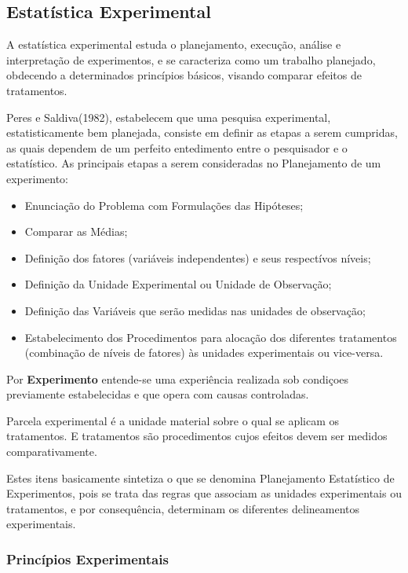 \subsection{Estatística Experimental}

A estatística experimental estuda o planejamento, execução, análise e interpretação de experimentos, e se caracteriza como um trabalho planejado, obdecendo a determinados princípios básicos, visando comparar efeitos de tratamentos.\vskip0.3cm

Peres e Saldiva(1982), estabelecem que uma pesquisa experimental, estatisticamente bem planejada, consiste em definir as etapas a serem cumpridas, as quais dependem de um perfeito entedimento entre o pesquisador e o estatístico. As principais etapas a serem consideradas no Planejamento de um experimento:


\begin{itemize}
\item Enunciação do Problema com Formulações das Hipóteses;
\item Comparar as Médias;
\item Definição dos fatores (variáveis independentes) e seus respectívos níveis;
\item Definição da Unidade Experimental ou Unidade de Observação;
\item Definição das Variáveis que serão medidas nas unidades de observação;
\item Estabelecimento dos Procedimentos para alocação dos diferentes tratamentos (combinação de níveis de fatores) às unidades experimentais ou vice-versa.
\end{itemize}

Por \textbf{Experimento} entende-se uma experiência realizada sob condiçoes previamente estabelecidas e que opera com causas controladas. \vskip0.3cm

Parcela experimental é a unidade  material sobre o qual se aplicam os tratamentos. E tratamentos são procedimentos cujos efeitos devem ser medidos comparativamente.
\vskip0.3cm

Estes itens basicamente sintetiza o que se denomina Planejamento Estatístico de Experimentos, pois se trata das regras que associam as unidades experimentais ou tratamentos, e por consequência, determinam os diferentes delineamentos experimentais.   

\subsubsection{Princípios Experimentais}

